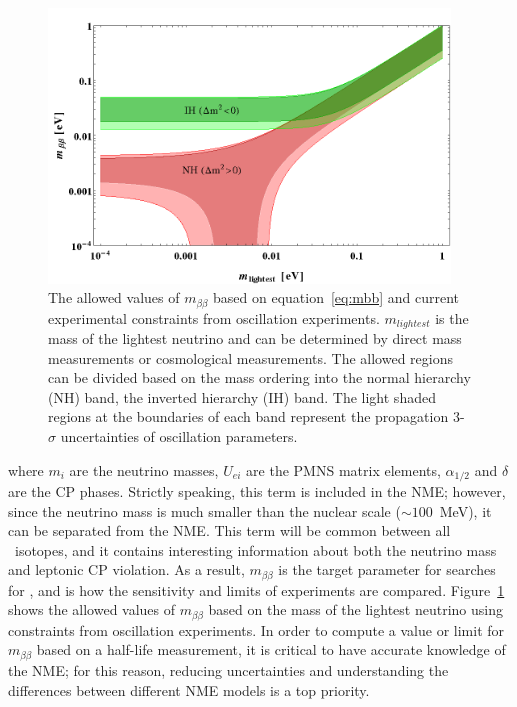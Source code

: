 \documentclass[/main.tex]{subfiles}
\begin{document}
\begin{itemize}
\begin{figure}[p]
    \includegraphics[width=0.95\textwidth]{lobsterplot}
    \caption[Allowed values of $m_{\beta\beta}$]{\label{fig:lobsterplot}
      The allowed values of $m_{\beta\beta}$ based on equation~\ref{eq:mbb} and current experimental constraints from oscillation experiments. $m_{lightest}$ is the mass of the lightest neutrino and can be determined by direct mass measurements or cosmological measurements. The allowed regions can be divided based on the mass ordering into the normal hierarchy (NH) band, the inverted hierarchy (IH) band. The light shaded regions at the boundaries of each band represent the propagation 3-$\sigma$ uncertainties of oscillation parameters\cite{lobsterplot}.
    }
  \end{figure}
  where $m_i$ are the neutrino masses, $U_{ei}$ are the PMNS matrix elements, $\alpha_{1/2}$ and $\delta$ are the CP phases.
  Strictly speaking, this term is included in the NME; however, since the neutrino mass is much smaller than the nuclear scale (${\sim}100$~MeV), it can be separated from the NME.
  This term will be common between all \znbb\ isotopes, and it contains interesting information about both the neutrino mass and leptonic CP violation.
  As a result, $m_{\beta\beta}$ is the target parameter for searches for \znbb, and is how the sensitivity and limits of experiments are compared.
  Figure~\ref{fig:lobsterplot} shows the allowed values of $m_{\beta\beta}$ based on the mass of the lightest neutrino using constraints from oscillation experiments.
  In order to compute a value or limit for $m_{\beta\beta}$ based on a half-life measurement, it is critical to have accurate knowledge of the NME; for this reason, reducing uncertainties and understanding the differences between different NME models is a top priority.

\end{itemize}
\end{document}
